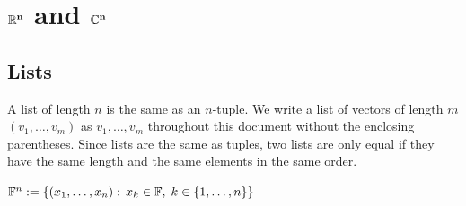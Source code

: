 \section{\texorpdfstring{$\mathbf{\mathbb{R}^n}$}{R\textasciicircum n} and \texorpdfstring{$\mathbf{\mathbb{C}^n}$}{C\textasciicircum n}}

\subsection{Lists}
\setcounter{thm}{7}
\begin{mydef} 
  A list of length $n$ is the same as an $n$-tuple. We write a list of vectors of length $m$ $(v_1, \ldots, v_m)$ as $v_1, \ldots, v_m$ throughout this document without the enclosing parentheses.
  Since lists are the same as tuples, two lists are only equal if they have the same length and the same elements in the same order.
\end{mydef}

\setcounter{thm}{10}
\begin{mydef} 
  $\mathbb{F}^n := \left \{ \left(x_1, \dots, x_n\right) : \, x_k \in \mathbb{F}, \; k \in \left\{1, \dots, n \right\} \right \}$
\end{mydef}